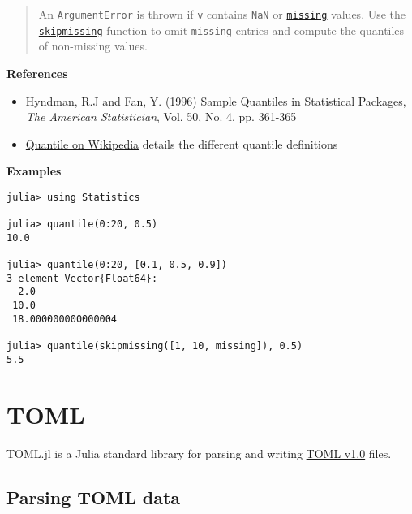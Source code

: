 \begin{adjustwidth}{2em}{0pt}
\begin{quote}
An \texttt{ArgumentError} is thrown if \texttt{v} contains \texttt{NaN} or \hyperlink{14596725676261444434}{\texttt{missing}} values. Use the \hyperlink{2012470681884771400}{\texttt{skipmissing}} function to omit \texttt{missing} entries and compute the quantiles of non-missing values.

\end{quote}
\textbf{References}

\begin{itemize}
\item Hyndman, R.J and Fan, Y. (1996) {\textquotedbl}Sample Quantiles in Statistical Packages{\textquotedbl}, \emph{The American Statistician}, Vol. 50, No. 4, pp. 361-365


\item \href{https://en.m.wikipedia.org/wiki/Quantile}{Quantile on Wikipedia} details the different quantile definitions

\end{itemize}
\textbf{Examples}


\begin{verbatim}
julia> using Statistics

julia> quantile(0:20, 0.5)
10.0

julia> quantile(0:20, [0.1, 0.5, 0.9])
3-element Vector{Float64}:
  2.0
 10.0
 18.000000000000004

julia> quantile(skipmissing([1, 10, missing]), 0.5)
5.5
\end{verbatim}



\end{adjustwidth}



\hypertarget{10794390672998231641}{}


\chapter{TOML}



TOML.jl is a Julia standard library for parsing and writing \href{https://toml.io/en/}{TOML v1.0} files.



\hypertarget{7293557212065198011}{}


\section{Parsing TOML data}




